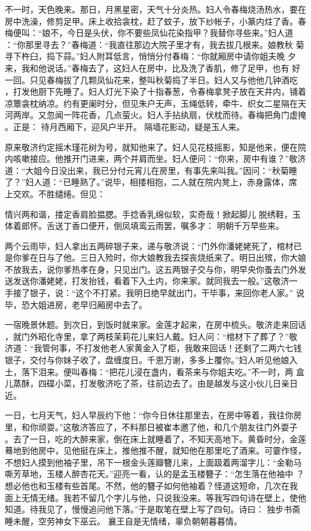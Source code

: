 不一时，天色晚来。那日，月黑星密，天气十分炎热。妇人令春梅烧汤热水，要在
房中洗澡，修剪足甲。床上收拾衾枕，赶了蚊子，放下纱帐子，小篆内炷了香。春
梅便叫：“娘不，今日是头伏，你不要些凤仙花染指甲？我替你寻些来。”妇人道
：“你那里寻去？”春梅道：“我直往那边大院子里才有，我去拔几根来。娘教秋
菊寻下杵臼，捣下蒜。”妇人附耳低言，悄悄分付春梅：“你就厢房中请你姐夫晚
夕来，我和他说话。”春梅去了，这妇人在房中，比及洗了香肌，修了足甲，也有
好一回。只见春梅拔了几颗凤仙花来，整叫秋菊捣了半日。妇人又与他他几钟酒吃
，打发他厨下先睡了。妇人灯光下染了十指春葱，令春梅拿凳子放在天井内，铺着
凉簟衾枕纳凉。约有更阑时分，但见朱户无声，玉绳低转，牵牛、织女二星隔在天
河两岸。又忽闻一阵花香，几点萤火。妇人手拈纨扇，伏枕而待。春梅把角门虚掩
。正是：
待月西厢下，迎风户半开。
隔墙花影动，疑是玉人来。

原来敬济约定摇木瑾花树为号，就知他来了。妇人见花枝摇影，知是他来，便在院
内咳嗽接应。他推开门进来，两个并肩而坐。妇人便问：“你来，房中有谁？”敬济
道：“大姐今日没出来，我已分付元宵儿在房里，有事先来叫我。”因问：“秋菊睡
了？”妇人道：“已睡熟了。”说毕，相搂相抱，二人就在院内凳上，赤身露体，席
上交欢。不胜缱绻。但见：

情兴两和谐，搂定香肩脸揾腮。手捻香乳绵似软，实奇哉！掀起脚儿
脱绣鞋，玉体着郎怀。舌送丁香口便开，倒凤填鸾云雨罢，嘱多才：
明朝千万早些来。

两个云雨毕，妇人拿出五两碎银子来，递与敬济说：“门外你潘姥姥死了，棺材已
是你爹在日与了他。三日入殓时，你大娘教我去探丧烧纸来了。明日出殡，你大娘
不放我去，说你爹热孝在身，只见出门。这五两银子交与你，明早央你蚤去门外发
送发送你潘姥姥，打发抬钱，看着下入土内，你来家。就同我去一般。”这敬济一
手接了银子，说：“这个不打紧。我明日绝早就出门，干毕事，来回你老人家。”
说毕，恐大姐进房，老早归厢房中去了。

一宿晚景休题。到次日，到饭时就来家。金莲才起来，在房中梳头。敬济走来回话
，就门外昭化寺里，拿了两枝茉莉花儿来妇人戴。妇人问：“棺材下了葬了？”敬
济道：“我管何事，不打发他老人家黄金入了柜，我敢来回话！还剩了二两六七钱
银子，交付与你妹子收了，盘缠度日。千恩万谢，多多上覆你。”妇人听见他娘入
土，落下泪来。便叫春梅：“把花儿浸在盏内，看茶来与你姐夫吃。”不一时，两
盒儿蒸酥，四碟小菜，打发敬济吃了茶，往前边去了。由是越发与这小伙儿日亲日
近。

一日，七月天气，妇人早辰约下他：“你今日休往那里去，在房中等着，我往你房
里，和你顽耍。”这敬济答应了，不料那日被崔本邀了他，和几个朋友往门外耍子
。去了一日，吃的大醉来家，倒在床上就睡着了，不知天高地下。黄昏时分，金莲
蓦地到他房中，见他挺在床上，推他推不醒，就知他在那里吃了酒来。可霎作怪，
不想妇人摸到他袖子里，吊下一根金头莲瓣簪儿来，上面趿着两溜字儿：“金勒马
嘶芳草地，玉楼人醉杏花天。”迎亮一看，认的是孟玉楼簪子：“怎生落在他袖中
？想必他也和玉楼有些首尾。不然，他的簪子如何他袖着？怪道这短命，几次在我
面上无情无绪。我若不留几个字儿与他，只说我没来。等我写四句诗在壁上，使他
知道。待我见了，慢慢追问他下落。”于是取笔在壁上写了四句。诗曰：
独步书斋睡未醒，空劳神女下巫云。
襄王自是无情绪，辜负朝朝暮暮情。

